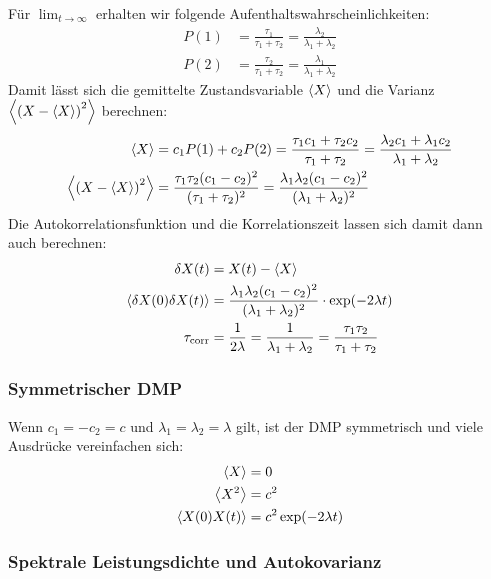 \documentclass[main.tex]{subfiles}
\begin{document}
Für \( \lim_{t \to \infty} \) erhalten wir folgende
Aufenthaltswahrscheinlichkeiten:
\begin{align}
	P(1) & = \frac{\tau_1}{\tau_1 + \tau_2} =
	\frac{\lambda_2 }{\lambda_1 +
		\lambda_2}
	\\
	P(2) & = \frac{\tau_2}{\tau_1 + \tau_2} =
	\frac{\lambda_1 }{\lambda_1 +
		\lambda_2}
\end{align}
Damit lässt sich die gemittelte Zustandsvariable \(\expval{X}\) und die Varianz
\(\expval{\qty(X - \expval{X})^2}\) berechnen:
\begin{align}
	\expval{X}                      & = c_1 P(1) + c_2 P(2) = \frac{\tau_1
		c_1 + \tau_2
		c_2}{\tau_1 + \tau_2} = \frac{\lambda_2 c_1 + \lambda_1
		c_2}{\lambda_1 +
		\lambda_2}
	\\
	\expval{\qty(X - \expval{X})^2} & = \frac{\tau_1 \tau_2
		(c_1-c_2)^2}{(\tau_1 + \tau_2)^2} = \frac{\lambda_1 \lambda_2
		(c_1-c_2)^2}{(\lambda_1 + \lambda_2)^2}
\end{align}
Die Autokorrelationsfunktion und die Korrelationszeit lassen sich damit dann
auch berechnen:
\begin{align}
	\delta X(t)                     & = X(t) - \expval{X}
	\\
	\expval{\delta X(0)\delta X(t)} & = \frac{\lambda_1 \lambda_2
		(c_1-c_2)^2}{(\lambda_1 + \lambda_2)^2} \cdot \exp(-2\lambda t)
	\\
	\tau_\mathrm{corr}              & = \frac{1}{2\lambda} =
	\frac{1}{\lambda_1 +
		\lambda_2} = \frac{\tau_1 \tau_2}{\tau_1 + \tau_2}
\end{align}

\subsubsection*{Symmetrischer DMP}

Wenn \(c_1=-c_2=c\) und \(\lambda_1 = \lambda_2 = \lambda\) gilt, ist der DMP
symmetrisch und viele Ausdrücke vereinfachen sich:
\begin{align}
	\expval{X}        & = 0                     \\
	\expval{X^2}      & = c^2                   \\
	\expval{X(0)X(t)} & = c^2 \exp(-2\lambda t)\label{eq:autokorr-sym-dmp}
\end{align}

\subsubsection*{Spektrale Leistungsdichte und Autokovarianz}
\end{document}

